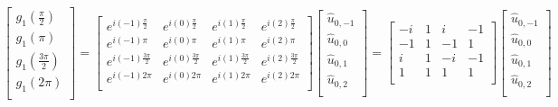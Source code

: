 \begin{eqnarray}
\begin{bmatrix}
    g_1(\frac{\pi}{2}) \\
    g_1(\pi) \\
    g_1(\frac{3\pi}{2}) \\
    g_1(2\pi) \\
\end{bmatrix}
=
\begin{bmatrix}
    e^{i(-1)\frac{\pi}{2}} & e^{i(0)\frac{\pi}{2}} & e^{i(1)\frac{\pi}{2}} & e^{i(2)\frac{\pi}{2}} \\
    e^{i(-1)\pi}           & e^{i(0)\pi}           & e^{i(1)\pi}           & e^{i(2)\pi} \\
    e^{i(-1)\frac{3\pi}{2}} & e^{i(0)\frac{3\pi}{2}} & e^{i(1)\frac{3\pi}{2}} & e^{i(2)\frac{3\pi}{2}} \\
    e^{i(-1)2\pi}           & e^{i(0)2\pi}           & e^{i(1)2\pi}           & e^{i(2)2\pi} \\
\end{bmatrix}
\begin{bmatrix}
    \hat u_{0,-1} \\
    \hat u_{0,0} \\
    \hat u_{0,1} \\
    \hat u_{0,2} \\
\end{bmatrix}
=
\begin{bmatrix}
    -i&1&i&-1\\
    -1&1&-1&1\\
    i&1&-i&-1\\
    1&1&1&1\\
\end{bmatrix}
\begin{bmatrix}
    \hat u_{0,-1} \\
    \hat u_{0,0} \\
    \hat u_{0,1} \\
    \hat u_{0,2} \\
\end{bmatrix}
\end{eqnarray}


